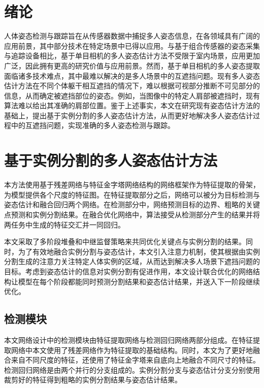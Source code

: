\begin{outstandingabstract}
    \section{绪论}
	人体姿态检测与跟踪旨在从传感器数据中捕捉多人姿态信息，在各领域具有广阔的应用前景，其中部分技术在特定场景中已得以应用。与基于组合传感器的姿态采集与追踪设备相比，基于单目相机的多人姿态估计方法不受限于室内场景，应用更加广泛，因此拥有更高的研究价值与应用前景。然而，基于单目相机的多人姿态提取面临诸多技术难点，其中最难以解决的是多人场景中的互遮挡问题。现有多人姿态估计方法在不同个体躯干相互遮挡的情况下，难以根据可视部分推断不可见部分的信息，从而确定被遮挡部位的姿态。例如，当图像中的特定人肩部被遮挡时，现有算法难以给出其准确的肩部位置。鉴于上述事实，本文在研究现有姿态估计方法的基础上，提出基于实例分割的多人姿态估计方法，从而更好地解决多人姿态估计过程中的互遮挡问题，实现准确的多人姿态检测与跟踪。
	
	
    \section{基于实例分割的多人姿态估计方法}
	本方法使用基于残差网络\cite{He2015Deep}与特征金字塔网络\cite{Lin2016Feature}结构的网络框架作为特征提取的骨架，为模型提供各个尺度的特征图。在特征提取部分之后，网络可以被分为目标检测与姿态估计和融合回归两个网络。在检测部分中，网络预测目标的边界、粗略的关键点预测和实例分割结果。在融合优化网络中，算法接受从检测部分产生的结果并将两任务中生成的特征交汇并一同回归。
	
	本文采取了多阶段堆叠和中继监督策略来共同优化关键点与实例分割的结果\cite{wei2016convolutional}。同时，为了有效地融合实例分割与姿态估计，本文引入注意力机制，使其根据由实例分割生成的注意力关注特定人体实例的区域，从而达到解决多人场景下遮挡问题的目标。考虑到姿态估计的信息对实例分割有促进作用，本文设计联合优化的网络结构让模型在每个阶段都能同时预测分割结果和姿态估计结果，并送入下一阶段继续优化。
 
 	\subsection{检测模块}
 	本文网络设计中的检测模块由特征提取网络与检测回归网络两部分组成。在特征提取网络中本文使用了残差网络作为特征提取的基础结构。同时，本文为了更好地融合来自不同尺度的特征，还使用了特征金字塔\cite{Lin2016Feature}来自底向上地融合不同尺寸的特征。检测回归网络是由两个并行的分支组成的。实例分割分支与姿态估计分支分别使用裁剪好的特征得到粗略的实例分割结果与姿态估计结果。
 	

\end{outstandingabstract}
